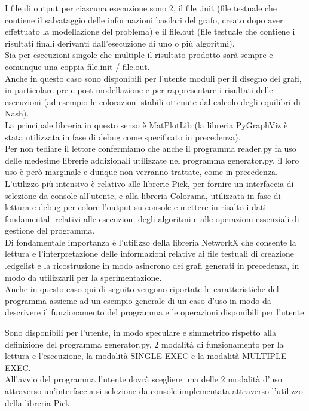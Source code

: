 I file di output per ciascuna esecuzione sono 2, il file .init (file testuale che contiene il salvataggio delle informazioni basilari del grafo, creato dopo aver effettuato la modellazione del problema) e il file.out (file testuale che contiene i risultati finali derivanti dall'esecuzione di uno o più algoritmi).\\

Sia per esecuzioni singole che multiple il risultato prodotto sarà sempre e comunque una coppia file.init / file.out.\\  

Anche in questo caso sono disponibili per l'utente moduli per il disegno dei grafi, in particolare pre e post modellazione e per rappresentare i risultati delle esecuzioni (ad esempio le colorazioni stabili ottenute dal calcolo degli equilibri di Nash).\\
La principale libreria in questo senso è MatPlotLib (la libreria PyGraphViz è stata utilizzata in fase di debug come specificato in precedenza).\\

Per non tediare il lettore confermiamo che anche il programma reader.py fa uso delle medesime librerie addizionali utilizzate nel programma generator.py, il loro uso è però marginale e dunque non verranno trattate, come in precedenza.\\
L'utilizzo più intensivo è relativo alle librerie Pick, per fornire un interfaccia di selezione da console all'utente, e alla libreria Colorama, utilizzata in fase di lettura e debug per colore l'output su console e mettere in risalto i dati fondamentali relativi alle esecuzioni degli algoritmi e alle operazioni essenziali di gestione del programma.\\

Di fondamentale importanza è l'utilizzo della libreria NetworkX che consente la lettura e l'interpretazione delle informazioni relative ai file testuali di creazione .edgelist e la ricostruzione in modo asincrono dei grafi generati in precedenza, in modo da utilizzarli per la sperimentazione.\\

Anche in questo caso qui di seguito vengono riportate le caratteristiche del programma assieme ad un esempio generale di un caso d'uso in modo da descrivere il funzionamento del programma e le operazioni disponibili per l'utente

Sono disponibili per l'utente, in modo speculare e simmetrico rispetto alla definizione del programma generator.py, 2 modalità di funzionamento per la lettura e l'esecuzione, la modalità SINGLE EXEC e la modalità MULTIPLE EXEC.\\
All'avvio del programma l'utente dovrà scegliere una delle 2 modalità d'uso attraverso un'interfaccia si selezione da console implementata attraverso l'utilizzo della libreria Pick.\\



